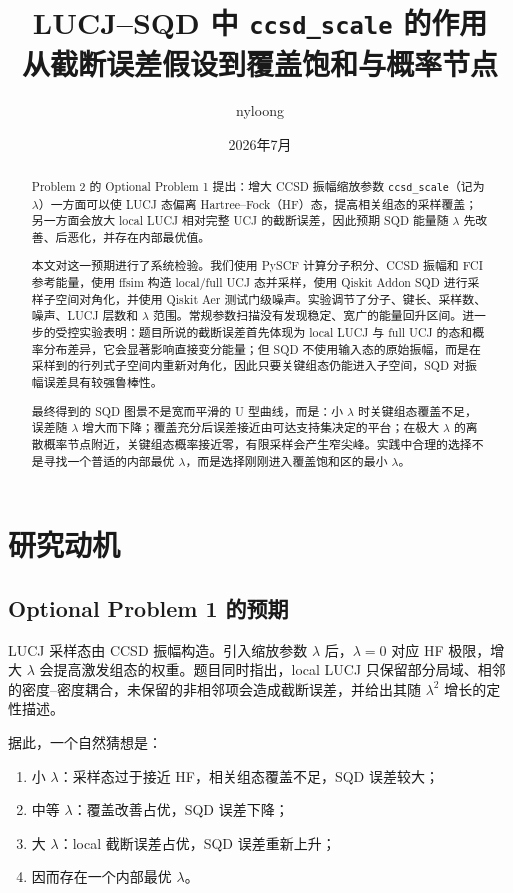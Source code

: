 \documentclass[UTF8,12pt,a4paper]{ctexart}
\title{LUCJ--SQD 中 \texttt{ccsd\_scale} 的作用\\
\large 从截断误差假设到覆盖饱和与概率节点}
\author{nyloong}
\date{2026年7月}
\begin{document}
\maketitle

\begin{abstract}
Problem 2 的 Optional Problem 1 提出：增大 CCSD 振幅缩放参数 \texttt{ccsd\_scale}（记为 $\lambda$）一方面可以使 LUCJ 态偏离 Hartree--Fock（HF）态，提高相关组态的采样覆盖；另一方面会放大 local LUCJ 相对完整 UCJ 的截断误差，因此预期 SQD 能量随 $\lambda$ 先改善、后恶化，并存在内部最优值。

本文对这一预期进行了系统检验。我们使用 PySCF 计算分子积分、CCSD 振幅和 FCI 参考能量，使用 ffsim 构造 local/full UCJ 态并采样，使用 Qiskit Addon SQD 进行采样子空间对角化，并使用 Qiskit Aer 测试门级噪声。实验调节了分子、键长、采样数、噪声、LUCJ 层数和 $\lambda$ 范围。常规参数扫描没有发现稳定、宽广的能量回升区间。进一步的受控实验表明：题目所说的截断误差首先体现为 local LUCJ 与 full UCJ 的态和概率分布差异，它会显著影响直接变分能量；但 SQD 不使用输入态的原始振幅，而是在采样到的行列式子空间内重新对角化，因此只要关键组态仍能进入子空间，SQD 对振幅误差具有较强鲁棒性。

最终得到的 SQD 图景不是宽而平滑的 U 型曲线，而是：小 $\lambda$ 时关键组态覆盖不足，误差随 $\lambda$ 增大而下降；覆盖充分后误差接近由可达支持集决定的平台；在极大 $\lambda$ 的离散概率节点附近，关键组态概率接近零，有限采样会产生窄尖峰。实践中合理的选择不是寻找一个普适的内部最优 $\lambda$，而是选择刚刚进入覆盖饱和区的最小 $\lambda$。
\end{abstract}

\tableofcontents
\newpage

\section{研究动机}

\subsection{Optional Problem 1 的预期}

LUCJ 采样态由 CCSD 振幅构造。引入缩放参数 $\lambda$ 后，$\lambda=0$ 对应 HF 极限，增大 $\lambda$ 会提高激发组态的权重。题目同时指出，local LUCJ 只保留部分局域、相邻的密度--密度耦合，未保留的非相邻项会造成截断误差，并给出其随 $\lambda^2$ 增长的定性描述。

据此，一个自然猜想是：
\begin{enumerate}[label=(\arabic*)]
  \item 小 $\lambda$：采样态过于接近 HF，相关组态覆盖不足，SQD 误差较大；
  \item 中等 $\lambda$：覆盖改善占优，SQD 误差下降；
  \item 大 $\lambda$：local 截断误差占优，SQD 误差重新上升；
  \item 因而存在一个内部最优 $\lambda$。
\end{enumerate}
\end{document}
